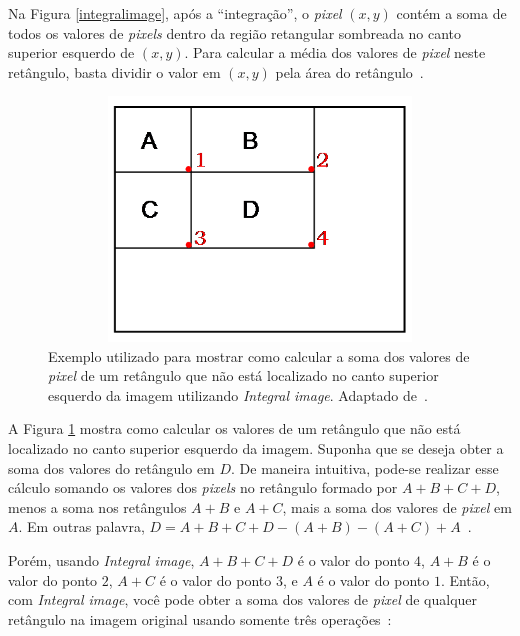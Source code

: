 Na Figura \ref{integralimage}, após a ``integração'', o \textit{pixel} $\displaystyle (x,y)$ contém a soma de todos os valores de \textit{pixels} dentro da região retangular sombreada no canto superior esquerdo de $\displaystyle (x,y)$. Para calcular a média dos valores de \textit{pixel} neste retângulo, basta dividir o valor em $\displaystyle (x,y)$ pela área do retângulo~\cite{servodetection}.

	\begin{figure}[hbt]
		\begin{center}
			\includegraphics[height=6.5cm,width=12.5cm]{figuras/2.FundamentacaoTeorica/integral_image2.png}
		\end{center}
		\caption{Exemplo utilizado para mostrar como calcular a soma dos valores de \textit{pixel} de um retângulo que não está localizado no canto superior esquerdo da imagem utilizando \textit{Integral image}. Adaptado de~\cite{servodetection}.}
		\label{integralimage2}
	\end{figure}

A Figura \ref{integralimage2} mostra como calcular os valores de um retângulo que não está localizado no canto superior esquerdo da imagem. Suponha que se deseja obter a soma dos valores do retângulo em $\displaystyle D$. De maneira intuitiva, pode-se realizar esse cálculo somando os valores dos \textit{pixels} no retângulo formado por $\displaystyle A+B+C+D$, menos a soma nos retângulos $\displaystyle A+B$ e $\displaystyle A+C$, mais a soma dos valores de \textit{pixel} em $\displaystyle A$. Em outras palavra, $\displaystyle D = A+B+C+D-(A+B)-(A+C)+A$~\cite{servodetection, violajones}.

Porém, usando \textit{Integral image}, $\displaystyle A+B+C+D$ é o valor do ponto $\displaystyle 4$, $\displaystyle A+B$ é o valor do ponto $\displaystyle 2$, $\displaystyle A+C$ é o valor do ponto $\displaystyle 3$, e $\displaystyle A$ é o valor do ponto $\displaystyle 1$. Então, com \textit{Integral image}, você pode obter a soma dos valores de \textit{pixel} de qualquer retângulo na imagem original usando somente três operações~\cite{servodetection, violajones}:

